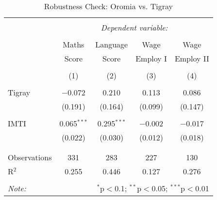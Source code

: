 

\begin{table}[!htbp] \centering 
  \caption{Robustness Check: Oromia vs. Tigray} 
  \label{} 
\begin{tabular}{@{\extracolsep{5pt}}lcccc} 
\\[-1.8ex]\hline 
\hline \\[-1.8ex] 
 & \multicolumn{4}{c}{\textit{Dependent variable:}} \\ 
\cline{2-5} 
\\[-1.8ex] & Maths & Language & Wage & Wage \\ 
 & Score & Score & Employ I & Employ II \\
\\[-1.8ex] & (1) & (2) & (3) & (4)\\ 
\hline \\[-1.8ex] 
 Tigray & $-$0.072 & 0.210 & 0.113 & 0.086 \\ 
  & (0.191) & (0.164) & (0.099) & (0.147) \\ 
  & & & & \\ 
 IMTI & 0.065$^{***}$ & 0.295$^{***}$ & $-$0.002 & $-$0.017 \\ 
  & (0.022) & (0.030) & (0.012) & (0.018) \\ 
  & & & & \\ 
\hline \\[-1.8ex] 
Observations & 331 & 283 & 227 & 130 \\ 
R$^{2}$ & 0.255 & 0.446 & 0.127 & 0.276 \\ 
\hline 
\hline \\[-1.8ex] 
\textit{Note:}  & \multicolumn{4}{r}{$^{*}$p$<$0.1; $^{**}$p$<$0.05; $^{***}$p$<$0.01} \\ 
\end{tabular} 
\end{table} 



